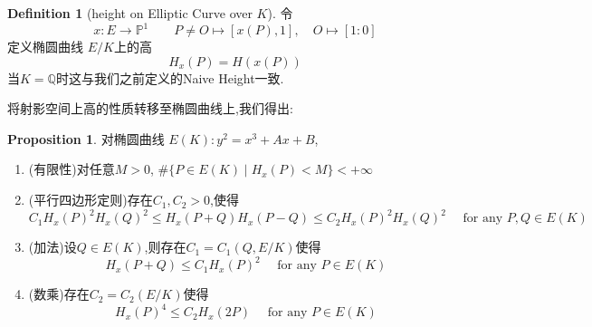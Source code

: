 \documentclass[12pt,A4paper,oneside,reqno]{amsart}
\numberwithin{equation}{section}
\theoremstyle{definition}
\newtheorem{proposition}[theorem]{Proposition}
\newtheorem{defn}[theorem]{Definition}
\theoremstyle{plain}
\theoremstyle{plain}
\numberwithin{equation}{section}
\theoremstyle{remark}
\begin{document}
\begin{defn}[height on Elliptic Curve over $K$]
	令$$x:E\longrightarrow \mathbb{P}^1 \qquad P\neq O \longmapsto [x(P),1], \quad O \longmapsto [1:0]$$
	定义椭圆曲线 $E/K$上的高
	$$H_x(P)=H(x(P))$$
	当$K=\mathbb{Q}$时这与我们之前定义的Naive Height一致.
\end{defn}
将射影空间上高的性质转移至椭圆曲线上,我们得出:
\begin{proposition}
	对椭圆曲线 $E(K)\colon y^2=x^3+Ax+B$,
	\begin{enumerate}[1.]
		\item\label{item:finiteness} (有限性)对任意$M>0$, $\#\{P \in E(K)\mid H_x(P)<M \} < + \infty$
		\item\label{item:parel} (平行四边形定则)存在$C_1,C_2>0$,使得
		$$C_1H_x(P)^2H_x(Q)^2 \leqslant H_x(P+Q)H_x(P-Q) \leqslant C_2H_x(P)^2H_x(Q)^2 \quad\text{ for any }P,Q \in E(K)$$
		\item\label{item:add} (加法)设$Q \in E(K)$,则存在$C_1=C_1(Q,E/K)$使得
		$$H_x(P+Q) \leqslant C_1H_x(P)^2 \quad\text{ for any }P \in E(K)$$
		\item\label{item:mult} (数乘)存在$C_2=C_2(E/K)$使得
		$$H_x(P)^4 \leqslant C_2H_x(2P) \quad\text{ for any }P \in E(K)$$
	\end{enumerate}
\end{proposition}
\end{document}
